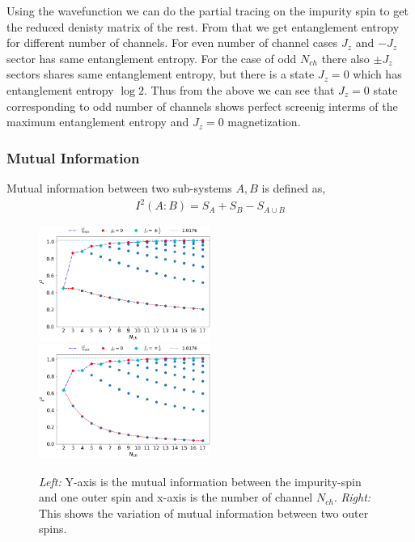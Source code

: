 \documentclass[reprint,prb,superscriptaddress]{revtex4-2}
\begin{document}
\noindent Using the wavefunction we can do the partial tracing on the impurity spin to get the reduced denisty matrix of the rest. From that we get entanglement entropy for different number of channels. For even number of channel cases $J_z$ and $-J_z$ sector has same entanglement entropy. For the case of odd $N_{ch}$ there also $\pm J_z$ sectors shares same entanglement entropy, but there is a state $J_z=0$ which has entanglement entropy $\log 2$. Thus from the above we can see that $J_z=0$ state corresponding to odd number of channels shows perfect screenig interms of the maximum entanglement entropy and $J_z=0$ magnetization.


\subsubsection{Mutual Information}

Mutual information between two sub-systems $A, B$ is defined as, 
\begin{eqnarray}
I^2(A:B)=S_A+S_B-S_{A\cup B}
\end{eqnarray}

\begin{figure}[!ht]
\centering
\includegraphics[width=0.5\textwidth]{plt/I_2_vs_Nch_0_1}
\includegraphics[width=0.5\textwidth]{plt/I_2_vs_Nch_1_2}
\caption{\textit{Left:} Y-axis is the mutual information between the impurity-spin and one outer spin and x-axis is the number of channel $N_{ch}$. \textit{Right:} This shows the variation of mutual information between two outer spins.}
\label{fig:MI_vs_Nch}
\end{figure}
\end{document}
